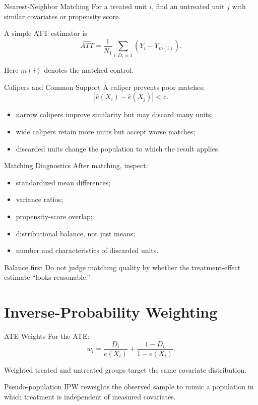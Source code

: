 \documentclass[aspectratio=169,11pt]{beamer}
\begin{document}
\begin{frame}{Nearest-Neighbor Matching}
For a treated unit \(i\), find an untreated unit \(j\) with similar covariates or propensity score.

A simple ATT estimator is
\[
\widehat{ATT}
=
\frac{1}{N_1}
\sum_{i:D_i=1}
\left(
Y_i-Y_{m(i)}
\right).
\]

Here \(m(i)\) denotes the matched control.
\end{frame}

\begin{frame}{Calipers and Common Support}
A caliper prevents poor matches:
\[
|\widehat e(X_i)-\widehat e(X_j)|<c.
\]

\begin{itemize}
\item narrow calipers improve similarity but may discard many units;
\item wide calipers retain more units but accept worse matches;
\item discarded units change the population to which the result applies.
\end{itemize}
\end{frame}

\begin{frame}{Matching Diagnostics}
After matching, inspect:
\begin{itemize}
\item standardized mean differences;
\item variance ratios;
\item propensity-score overlap;
\item distributional balance, not just means;
\item number and characteristics of discarded units.
\end{itemize}

\begin{alertblock}{Balance first}
Do not judge matching quality by whether the treatment-effect estimate “looks reasonable.”
\end{alertblock}
\end{frame}

\section{Inverse-Probability Weighting}

\begin{frame}{ATE Weights}
For the ATE:
\[
w_i=
\frac{D_i}{e(X_i)}
+
\frac{1-D_i}{1-e(X_i)}.
\]

Weighted treated and untreated groups target the same covariate distribution.

\begin{block}{Pseudo-population}
IPW reweights the observed sample to mimic a population in which treatment is independent of measured covariates.
\end{block}
\end{frame}
\end{document}
